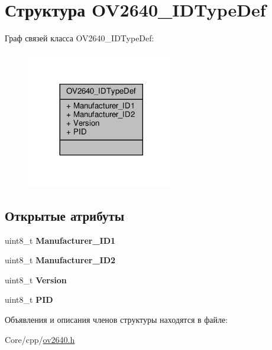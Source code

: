 \hypertarget{struct_o_v2640___i_d_type_def}{}\section{Структура O\+V2640\+\_\+\+I\+D\+Type\+Def}
\label{struct_o_v2640___i_d_type_def}


Граф связей класса O\+V2640\+\_\+\+I\+D\+Type\+Def\+:
\nopagebreak
\begin{figure}[H]
\begin{center}
\leavevmode
\includegraphics[width=185pt]{struct_o_v2640___i_d_type_def__coll__graph}
\end{center}
\end{figure}
\subsection*{Открытые атрибуты}
\begin{DoxyCompactItemize}
\item 
\mbox{\label{struct_o_v2640___i_d_type_def_a9234fc83d7138ea4b399f8ed3c45b814}} 
uint8\+\_\+t {\bfseries Manufacturer\+\_\+\+I\+D1}
\item 
\mbox{\label{struct_o_v2640___i_d_type_def_a69300e45b4b68eea3aaa15ed5ef5697d}} 
uint8\+\_\+t {\bfseries Manufacturer\+\_\+\+I\+D2}
\item 
\mbox{\label{struct_o_v2640___i_d_type_def_a5e5a1dec9edbae87275e34740cc97325}} 
uint8\+\_\+t {\bfseries Version}
\item 
\mbox{\label{struct_o_v2640___i_d_type_def_a9d9b7b366f1a714dca3c678a2d2d4a28}} 
uint8\+\_\+t {\bfseries P\+ID}
\end{DoxyCompactItemize}


Объявления и описания членов структуры находятся в файле\+:\begin{DoxyCompactItemize}
\item 
Core/cpp/\hyperlink{ov2640_8h}{ov2640.\+h}\end{DoxyCompactItemize}

